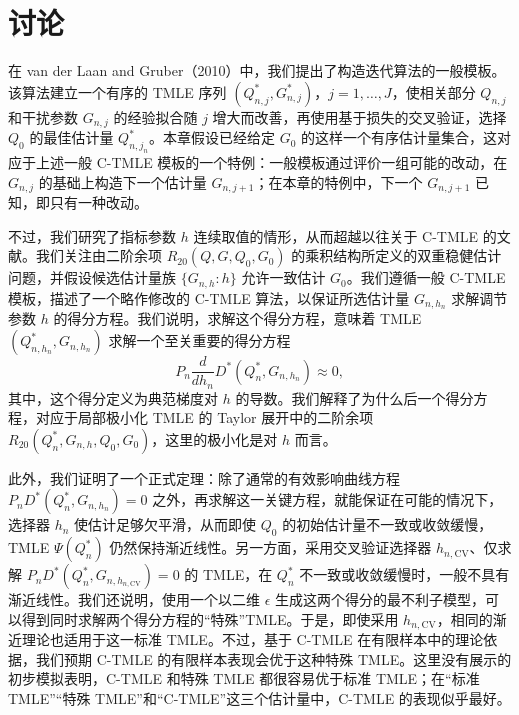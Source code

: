 \section{讨论}
\label{sec:ch10-discussion}

在 van der Laan and Gruber（2010）中，我们提出了构造迭代算法的一般模板。该算法建立一个有序的 TMLE 序列
$(Q_{n,j}^*,G_{n,j}^*)$，$j=1,\ldots,J$，使相关部分 $Q_{n,j}$ 和干扰参数 $G_{n,j}$ 的经验拟合随 $j$ 增大而改善，再使用基于损失的交叉验证，选择 $Q_0$ 的最佳估计量 $Q_{n,j_n}^*$。本章假设已经给定 $G_0$ 的这样一个有序估计量集合，这对应于上述一般 C-TMLE 模板的一个特例：一般模板通过评价一组可能的改动，在 $G_{n,j}$ 的基础上构造下一个估计量 $G_{n,j+1}$；在本章的特例中，下一个 $G_{n,j+1}$ 已知，即只有一种改动。

不过，我们研究了指标参数 $h$ 连续取值的情形，从而超越以往关于 C-TMLE 的文献。我们关注由二阶余项 $R_{20}(Q,G,Q_0,G_0)$ 的乘积结构所定义的双重稳健估计问题，并假设候选估计量族 $\{G_{n,h}:h\}$ 允许一致估计 $G_0$。我们遵循一般 C-TMLE 模板，描述了一个略作修改的 C-TMLE 算法，以保证所选估计量 $G_{n,h_n}$ 求解调节参数 $h$ 的得分方程。我们说明，求解这个得分方程，意味着 TMLE $(Q_{n,h_n}^*,G_{n,h_n})$ 求解一个至关重要的得分方程
\[
 P_n\frac{d}{dh_n}D^*(Q_n^*,G_{n,h_n})\approx0,
\]
其中，这个得分定义为典范梯度对 $h$ 的导数。我们解释了为什么后一个得分方程，对应于局部极小化 TMLE 的 Taylor 展开中的二阶余项
$R_{20}(Q_n^*,G_{n,h},Q_0,G_0)$，这里的极小化是对 $h$ 而言。

此外，我们证明了一个正式定理：除了通常的有效影响曲线方程
$P_nD^*(Q_n^*,G_{n,h_n})=0$
之外，再求解这一关键方程，就能保证在可能的情况下，选择器 $h_n$ 使估计足够欠平滑，从而即使 $Q_0$ 的初始估计量不一致或收敛缓慢，TMLE $\Psi(Q_n^*)$ 仍然保持渐近线性。另一方面，采用交叉验证选择器 $h_{n,\mathrm{CV}}$、仅求解
$P_nD^*(Q_n^*,G_{n,h_{n,\mathrm{CV}}})=0$
的 TMLE，在 $Q_n^*$ 不一致或收敛缓慢时，一般不具有渐近线性。我们还说明，使用一个以二维 $\epsilon$ 生成这两个得分的最不利子模型，可以得到同时求解两个得分方程的“特殊”TMLE。于是，即使采用 $h_{n,\mathrm{CV}}$，相同的渐近理论也适用于这一标准 TMLE。不过，基于 C-TMLE 在有限样本中的理论依据，我们预期 C-TMLE 的有限样本表现会优于这种特殊 TMLE。这里没有展示的初步模拟表明，C-TMLE 和特殊 TMLE 都很容易优于标准 TMLE；在“标准 TMLE”“特殊 TMLE”和“C-TMLE”这三个估计量中，C-TMLE 的表现似乎最好。

